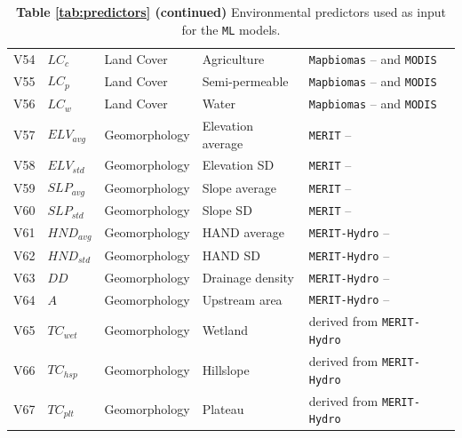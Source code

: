 \documentclass[12pt]{article}
\begin{document}
\begin{table}[t]
\begin{tabular}{p{0.5cm}p{1cm}p{2cm}p{3.5cm}p{5cm}}
V54 & $LC_{c}$ & Land Cover & Agriculture & \texttt{Mapbiomas} -- \cite{souza2020} and \texttt{MODIS}\\
V55 & $LC_{p}$ & Land Cover & Semi-permeable & \texttt{Mapbiomas} -- \cite{souza2020} and \texttt{MODIS}\\
V56 & $LC_{w}$ & Land Cover & Water & \texttt{Mapbiomas} -- \cite{souza2020} and \texttt{MODIS}\\
V57 & $ELV_{avg}$ & Geomorphology & Elevation average & \texttt{MERIT} -- \cite{yamazaki2017}\\
V58 & $ELV_{std}$ & Geomorphology & Elevation SD & \texttt{MERIT} -- \cite{yamazaki2017}\\
V59 & $SLP_{avg}$ & Geomorphology & Slope average & \texttt{MERIT} -- \cite{yamazaki2017}\\
V60 & $SLP_{std}$ & Geomorphology & Slope SD & \texttt{MERIT} -- \cite{yamazaki2017}\\
V61 & $HND_{avg}$ & Geomorphology & HAND average & \texttt{MERIT-Hydro} -- \cite{yamazaki2019}\\
V62 & $HND_{std}$ & Geomorphology & HAND SD & \texttt{MERIT-Hydro} -- \cite{yamazaki2019}\\
V63 & $DD$ & Geomorphology & Drainage density & \texttt{MERIT-Hydro} -- \cite{yamazaki2019}\\
V64 & $A$ & Geomorphology & Upstream area & \texttt{MERIT-Hydro} -- \cite{yamazaki2019}\\
V65 & $TC_{wet}$ & Geomorphology & Wetland & derived from \texttt{MERIT-Hydro}\\
V66 & $TC_{hsp}$ & Geomorphology & Hillslope & derived from \texttt{MERIT-Hydro}\\
V67 & $TC_{plt}$ & Geomorphology & Plateau & derived from \texttt{MERIT-Hydro}\\
\bottomrule
\end{tabular}
\caption*{\textbf{Table \ref{tab:predictors} (continued)} Environmental predictors used as input for the \texttt{ML} models.}
\end{table}
\end{document}
